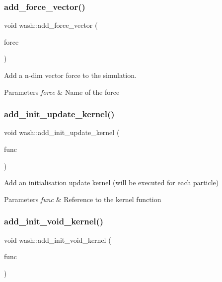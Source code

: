 \subsubsection{\texorpdfstring{add\+\_\+force\+\_\+vector()}{add\_force\_vector()}}
{\footnotesize\ttfamily void wash\+::add\+\_\+force\+\_\+vector (\begin{DoxyParamCaption}\item[{const std\+::string}]{force }\end{DoxyParamCaption})}



Add a n-\/dim vector force to the simulation. 


\begin{DoxyParams}{Parameters}
{\em force} & Name of the force \\
\hline
\end{DoxyParams}
\mbox{\label{namespacewash_a2bed8ccfb6599a8edd0eb88037d8c8af}} 
\subsubsection{\texorpdfstring{add\+\_\+init\+\_\+update\+\_\+kernel()}{add\_init\_update\_kernel()}}
{\footnotesize\ttfamily void wash\+::add\+\_\+init\+\_\+update\+\_\+kernel (\begin{DoxyParamCaption}\item[{const Update\+FuncT}]{func }\end{DoxyParamCaption})}



Add an initialisation update kernel (will be executed for each particle) 


\begin{DoxyParams}{Parameters}
{\em func} & Reference to the kernel function \\
\hline
\end{DoxyParams}
\mbox{\label{namespacewash_a4aa9c050821f26f11d51e72a861a1102}} 
\subsubsection{\texorpdfstring{add\+\_\+init\+\_\+void\+\_\+kernel()}{add\_init\_void\_kernel()}}
{\footnotesize\ttfamily void wash\+::add\+\_\+init\+\_\+void\+\_\+kernel (\begin{DoxyParamCaption}\item[{const Void\+FuncT}]{func }\end{DoxyParamCaption})}



